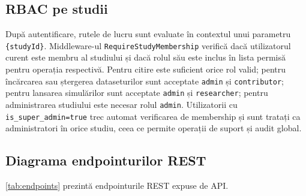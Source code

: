 \subsection{RBAC pe studii}
\label{subsec:rbac_studii}

După autentificare, rutele de lucru sunt evaluate în contextul unui parametru
\texttt{\{studyId\}}. Middleware-ul \texttt{RequireStudyMembership} verifică
dacă utilizatorul curent este membru al studiului și dacă rolul său este inclus
în lista permisă pentru operația respectivă. Pentru citire este suficient orice
rol valid; pentru încărcarea sau ștergerea dataseturilor sunt acceptate
\texttt{admin} și \texttt{contributor}; pentru lansarea simulărilor sunt
acceptate \texttt{admin} și \texttt{researcher}; pentru administrarea
studiului este necesar rolul \texttt{admin}. Utilizatorii cu
\texttt{is\_super\_admin=true} trec automat verificarea de membership și sunt
tratați ca administratori în orice studiu, ceea ce permite operații de suport
și audit global.

\subsection{Diagrama endpointurilor REST}
\label{subsec:endpoints}

\cref{tab:endpoints} prezintă endpointurile REST expuse de API.

